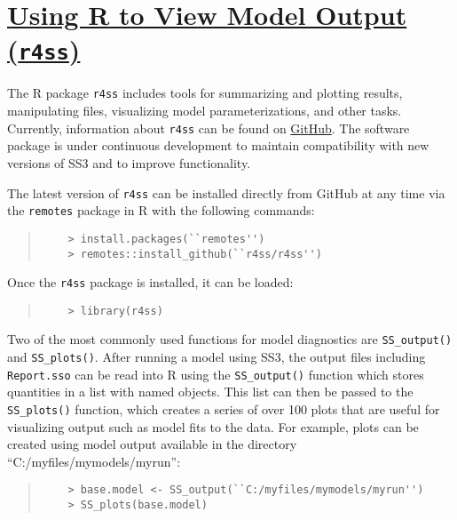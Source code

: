 \section[Using R to View Model Output (\texttt{r4ss})]{\protect\hyperref[sec:r4ss]{Using R to View Model Output (\texttt{r4ss})}}\label{sec:r4ss}

The R package \texttt{r4ss} includes tools for summarizing and plotting results, manipulating files, visualizing model parameterizations, and other tasks. Currently, information about \texttt{r4ss} can be found on \href{https://github.com/r4ss/r4ss}{GitHub}.  The software package is under continuous development to maintain compatibility with new versions of SS3 and to improve functionality.

The latest version of \texttt{r4ss} can be installed directly from GitHub at any time via the \texttt{remotes} package in R with the following commands:

\begin{quote}
	\begin{verbatim}
	> install.packages(``remotes'')
	> remotes::install_github(``r4ss/r4ss'')
	\end{verbatim}
\end{quote}

Once the \texttt{r4ss} package is installed, it can be loaded:

\begin{quote}
	\begin{verbatim}
	> library(r4ss)
	\end{verbatim}
\end{quote}

Two of the most commonly used functions for model diagnostics are \texttt{SS\_output()} and \texttt{SS\_plots()}. After running a model using SS3, the output files including \texttt{Report.sso} can be read into R using the \texttt{SS\_output()} function which stores quantities in a list with named objects. This list can then be passed to the \texttt{SS\_plots()} function, which creates a series of over 100 plots that are useful for visualizing output such as model fits to the data. For example, plots can be created using model output available in the directory ``C:/myfiles/mymodels/myrun'':

\begin{quote}
	\begin{verbatim}
	> base.model <- SS_output(``C:/myfiles/mymodels/myrun'')
	> SS_plots(base.model)
	\end{verbatim}
\end{quote}
  
